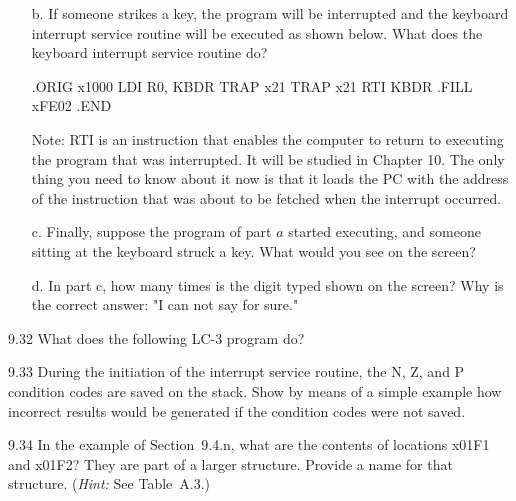\documentclass{patt}
\begin{document}
\begin{exercises}
\begin{enumerate}[a.]
\begin{colorverbatim}
\end{colorverbatim}

\item[b.] If someone strikes a key, the program will be interrupted and the
keyboard interrupt service routine will be executed as shown below.
What does the keyboard interrupt
  service routine do?
\begin{colorverbatim}
            .ORIG     x1000
            LDI       R0, KBDR
            TRAP      x21
            TRAP      x21
            RTI
    KBDR    .FILL     xFE02
            .END
\end{colorverbatim}
Note: RTI is an instruction that enables the computer to return to executing 
the program that was interrupted. It will be studied in Chapter 10. The only 
thing you need to know about it now is that it loads the PC with the address 
of the instruction that was about to be fetched when the interrupt occurred.
\item[c.] Finally, suppose the program of part $a$ started executing, and
  someone sitting at the keyboard struck a key. What would you see on
  the screen?
\item[d.] In part c, how many times is the digit typed shown on the screen? 
  Why is the correct answer: "I can not say for sure."
\end{enumerate}

\item[9.32] What does the following LC-3 program do?

\item[9.33] During the initiation of the interrupt service routine, the N, Z,
  and P condition codes are saved on the stack. Show by means of a
  simple example how incorrect results would be generated if the
  condition codes were not saved.

\item[9.34] In the example of Section~9.4.n, what are the contents of locations
  x01F1 and x01F2? They are part of a larger structure. Provide a name
  for that structure. ({\it Hint:} See Table~A.3.)


\end{exercises}
\end{document}
